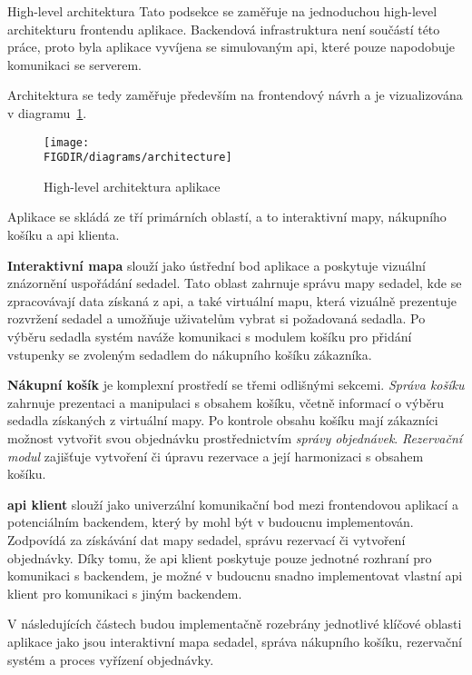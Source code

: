 \newpage
\begin{subsection}{High-level architektura}
    \label{subsec:implementace-architektura-high-level}
    Tato podsekce se zaměřuje na jednoduchou high-level architekturu frontendu aplikace.
    Backendová infrastruktura není součástí této práce, proto byla aplikace vyvíjena se simulovaným \ac{api}, které pouze napodobuje komunikaci se serverem.

    Architektura se tedy zaměřuje především na frontendový návrh a je vizualizována v diagramu~\ref{fig:implementace-architektura-high-level}.

    \begin{figure}[H]
        \centering
        \texttt{[image: \\FIGDIR/diagrams/architecture]}
        \caption{High-level architektura aplikace}
        \label{fig:implementace-architektura-high-level}
    \end{figure}

    Aplikace se skládá ze tří primárních oblastí, a to interaktivní mapy, nákupního košíku a \ac{api} klienta.

    \textbf{Interaktivní mapa} slouží jako ústřední bod aplikace a poskytuje vizuální znázornění uspořádání sedadel.
    Tato oblast zahrnuje správu mapy sedadel, kde se zpracovávají data získaná z \ac{api}, a také virtuální mapu, která vizuálně prezentuje rozvržení sedadel a umožňuje uživatelům vybrat si požadovaná sedadla.
    Po výběru sedadla systém naváže komunikaci s modulem košíku pro přidání vstupenky se zvoleným sedadlem do nákupního košíku zákazníka.

    \textbf{Nákupní košík} je komplexní prostředí se třemi odlišnými sekcemi.
    \textit{Správa košíku} zahrnuje prezentaci a manipulaci s obsahem košíku, včetně informací o výběru sedadla získaných z virtuální mapy.
    Po kontrole obsahu košíku mají zákazníci možnost vytvořit svou objednávku prostřednictvím \textit{správy objednávek}.
    \textit{Rezervační modul} zajišťuje vytvoření či úpravu rezervace a její harmonizaci s obsahem košíku.

    \textbf{\ac{api} klient} slouží jako univerzální komunikační bod mezi frontendovou aplikací a potenciálním backendem, který by mohl být v budoucnu implementován.
    Zodpovídá za získávání dat mapy sedadel, správu rezervací či vytvoření objednávky.
    Díky tomu, že \ac{api} klient poskytuje pouze jednotné rozhraní pro komunikaci s backendem, je možné v budoucnu snadno implementovat vlastní \ac{api} klient pro komunikaci s jiným backendem.

    V následujících částech budou implementačně rozebrány jednotlivé klíčové oblasti aplikace jako jsou interaktivní mapa sedadel, správa nákupního košíku, rezervační systém a proces vyřízení objednávky.
\end{subsection}
